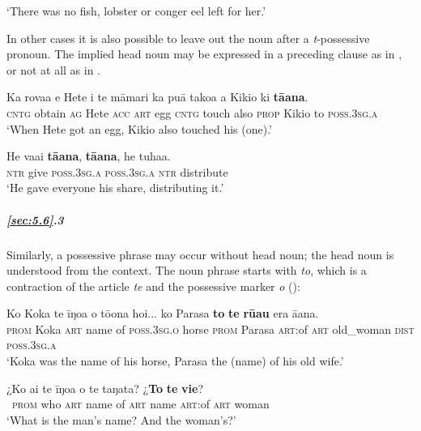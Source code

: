 \glt
‘There was no fish, lobster or conger eel left for her.’ \textstyleExampleref{[Mtx-4-04.003]}
\z

In other cases it is also possible to leave out the noun after a \textit{t}{}-possessive pronoun. The implied head noun may be expressed in a preceding clause as in , or not at all as in .

\ea\label{ex:5.100}
\gll Ka rova{\ꞌ}a e Hete i te māmari ka puā tako{\ꞌ}a a Kikio ki \textbf{tā{\ꞌ}ana}. \\
\textsc{cntg} obtain \textsc{ag} Hete \textsc{acc} \textsc{art} egg \textsc{cntg} touch also \textsc{prop} Kikio to \textsc{poss.3sg.a} \\

\glt 
‘When Hete got an egg, Kikio also touched his (one).’ \textstyleExampleref{[R438.042]} 
\z

\ea\label{ex:5.101}
\gll He va{\ꞌ}ai \textbf{tā{\ꞌ}ana}, \textbf{tā{\ꞌ}ana}, he tuha{\ꞌ}a. \\
\textsc{ntr} give \textsc{poss.3sg.a} \textsc{poss.3sg.a} \textsc{ntr} distribute \\

\glt 
‘He gave everyone his share, distributing it.’ \textstyleExampleref{[R372.123]} 
\z

\subparagraph{\ref{sec:5.6}.3} Similarly, a possessive phrase may occur without head noun; the head noun is understood from the context. The noun phrase starts with \textit{to}, which is a contraction of the article \textit{te} and the possessive marker \textit{o} ():

\ea\label{ex:5.102}
\gll Ko Koka te {\ꞌ}īŋoa o tō{\ꞌ}ona hoi... ko Parasa \textbf{to} \textbf{te} \textbf{rū{\ꞌ}au} era  {\ꞌ}ā{\ꞌ}ana.\\
\textsc{prom} Koka \textsc{art} name of \textsc{poss.3sg.o} horse \textsc{prom} Parasa \textsc{art}:of \textsc{art} old\_woman \textsc{dist}  \textsc{poss.3sg.a}\\

\glt 
‘Koka was the name of his horse, Parasa the (name) of his old wife.’ \textstyleExampleref{[R539-1.420]}
\z

\ea\label{ex:5.103}
\gll ¿Ko ai te {\ꞌ}īŋoa o te taŋata? ¿\textbf{To} \textbf{te} \textbf{vi{\ꞌ}e}? \\
~\textsc{prom} who \textsc{art} name of \textsc{art} name \textsc{art}:of \textsc{art} woman \\

\glt 
‘What is the man’s name? And the woman’s?’ \textstyleExampleref{[Notes]}
\z

